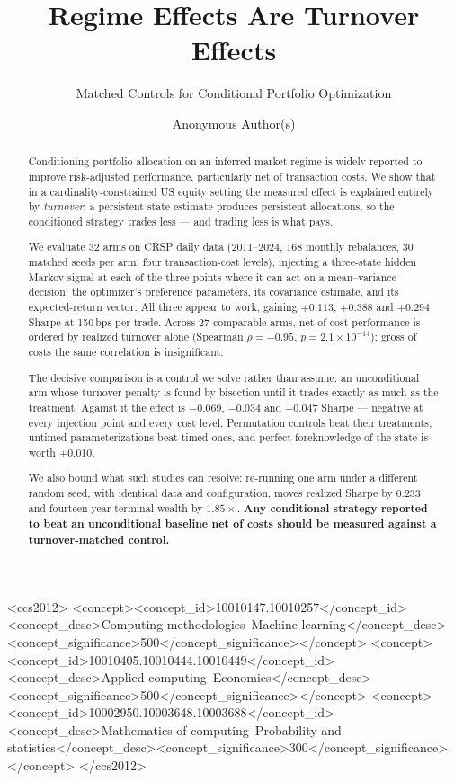 \documentclass[sigconf,anonymous,review]{acmart}
\begin{document}
\title{Regime Effects Are Turnover Effects}
\subtitle{Matched Controls for Conditional Portfolio Optimization}

\author{Anonymous Author(s)}

\begin{abstract}
Conditioning portfolio allocation on an inferred market regime is widely reported
to improve risk-adjusted performance, particularly net of transaction costs. We
show that in a cardinality-constrained US equity setting the measured effect is
explained entirely by \emph{turnover}: a persistent state estimate produces
persistent allocations, so the conditioned strategy trades less --- and trading
less is what pays.

We evaluate 32 arms on CRSP daily data (2011--2024, 168 monthly rebalances, 30
matched seeds per arm, four transaction-cost levels), injecting a three-state
hidden Markov signal at each of the three points where it can act on a
mean--variance decision: the optimizer's preference parameters, its covariance
estimate, and its expected-return vector. All three appear to work, gaining
$+0.113$, $+0.388$ and $+0.294$ Sharpe at 150\,bps per trade. Across 27
comparable arms, net-of-cost performance is ordered by realized turnover alone
(Spearman $\rho = -0.95$, $p = 2.1\times10^{-14}$); gross of costs the same
correlation is insignificant.

The decisive comparison is a control we solve rather than assume: an
unconditional arm whose turnover penalty is found by bisection until it trades
exactly as much as the treatment. Against it the effect is $-0.069$, $-0.034$ and
$-0.047$ Sharpe --- negative at every injection point and every cost level.
Permutation controls beat their treatments, untimed parameterizations beat timed
ones, and perfect foreknowledge of the state is worth $+0.010$.

We also bound what such studies can resolve: re-running one arm under a different
random seed, with identical data and configuration, moves realized Sharpe by
$0.233$ and fourteen-year terminal wealth by $1.85\times$. \textbf{Any conditional
strategy reported to beat an unconditional baseline net of costs should be
measured against a turnover-matched control.}
\end{abstract}

\begin{CCSXML}
<ccs2012>
<concept><concept_id>10010147.10010257</concept_id><concept_desc>Computing methodologies~Machine learning</concept_desc><concept_significance>500</concept_significance></concept>
<concept><concept_id>10010405.10010444.10010449</concept_id><concept_desc>Applied computing~Economics</concept_desc><concept_significance>500</concept_significance></concept>
<concept><concept_id>10002950.10003648.10003688</concept_id><concept_desc>Mathematics of computing~Probability and statistics</concept_desc><concept_significance>300</concept_significance></concept>
</ccs2012>
\end{CCSXML}
\end{document}
